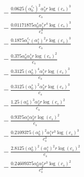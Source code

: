 \documentclass[10pt]{article}
\begin{document}
\begin{align*}
&{}  - \frac{0.0625 \left(\alpha_{0}^{c_s}\right)^{2} \alpha_{3}^s r \log{\left(c_{s} \right)}^{3}}{c_{s}} \\
&{}  - \frac{0.01171875 \alpha_{0}^s \alpha_{1}^s r^{4} \log{\left(c_{s} \right)}^{3}}{c_{s}^{4}} \\
&{}  - \frac{0.1875 \alpha_{1}^{c_s} \left(\alpha_{1}^s\right)^{2} r \log{\left(c_{s} \right)}^{3}}{c_{s}} \\
&{}  - \frac{0.375 \alpha_{0}^s \alpha_{4}^s r \log{\left(c_{s} \right)}^{2}}{c_{s}} \\
&{}  - \frac{0.3125 \left(\alpha_{0}^s\right)^{4} \alpha_{1}^s r \log{\left(c_{s} \right)}^{3}}{c_{s}} \\
&{}  - \frac{0.3125 \left(\alpha_{0}^s\right)^{2} \alpha_{3}^s r \log{\left(c_{s} \right)}^{3}}{c_{s}} \\
&{}  - \frac{1.25 \left(\alpha_{0}^s\right)^{3} \alpha_{2}^s r \log{\left(c_{s} \right)}^{2}}{c_{s}} \\
&{}  - \frac{0.9375 \alpha_{1}^s \alpha_{3}^s r \log{\left(c_{s} \right)}^{2}}{c_{s}} \\
&{}  - \frac{0.2109375 \left(\alpha_{0}^s\right)^{2} \alpha_{1}^s r^{3} \log{\left(c_{s} \right)}^{3}}{c_{s}^{3}} \\
&{}  - \frac{2.8125 \left(\alpha_{0}^s\right)^{2} \left(\alpha_{1}^s\right)^{2} r \log{\left(c_{s} \right)}^{2}}{c_{s}} \\
&{}  - \frac{0.24609375 \alpha_{0}^s \alpha_{2}^s r^{3} \log{\left(c_{s} \right)}^{2}}{c_{s}^{3}}
\end{align*}
\end{document}
